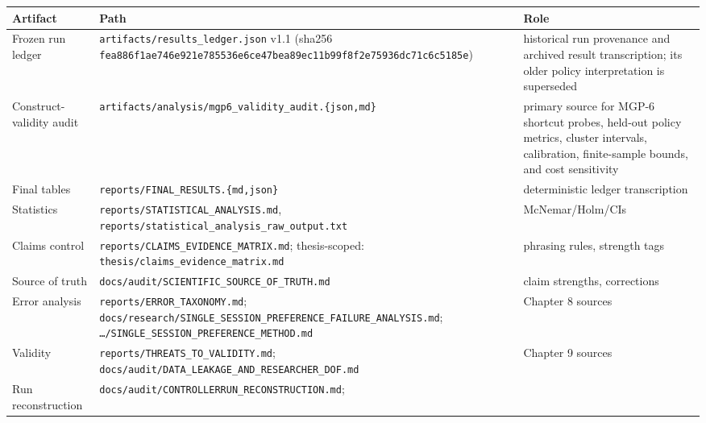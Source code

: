 {\def\LTcaptype{none} %
\begin{longtable}[]{@{}
  >{\raggedright\arraybackslash}p{}
  >{\raggedright\arraybackslash}p{}
  >{\raggedright\arraybackslash}p{}@{}}
\toprule\noalign{}
\begin{minipage}[b]{\linewidth}\raggedright
Artifact
\end{minipage} & \begin{minipage}[b]{\linewidth}\raggedright
Path
\end{minipage} & \begin{minipage}[b]{\linewidth}\raggedright
Role
\end{minipage} \\
\midrule\noalign{}
\endhead
\bottomrule\noalign{}
\endlastfoot
Frozen run ledger & \texttt{artifacts/results\_ledger.json} v1.1 (sha256
\texttt{fea886f1ae746e921e785536e6ce47bea89ec11b99f8f2e75936dc71c6c5185e})
& historical run provenance and archived result transcription; its older
policy interpretation is superseded \\
Construct-validity audit &
\texttt{artifacts/analysis/mgp6\_validity\_audit.\{json,md\}} & primary
source for MGP-6 shortcut probes, held-out policy metrics, cluster
intervals, calibration, finite-sample bounds, and cost sensitivity \\
Final tables & \texttt{reports/FINAL\_RESULTS.\{md,json\}} &
deterministic ledger transcription \\
Statistics & \texttt{reports/STATISTICAL\_ANALYSIS.md},
\texttt{reports/statistical\_analysis\_raw\_output.txt} &
McNemar/Holm/CIs \\
Claims control & \texttt{reports/CLAIMS\_EVIDENCE\_MATRIX.md};
thesis-scoped: \texttt{thesis/claims\_evidence\_matrix.md} & phrasing
rules, strength tags \\
Source of truth & \texttt{docs/audit/SCIENTIFIC\_SOURCE\_OF\_TRUTH.md} &
claim strengths, corrections \\
Error analysis & \texttt{reports/ERROR\_TAXONOMY.md};
\texttt{docs/research/SINGLE\_SESSION\_PREFERENCE\_FAILURE\_ANALYSIS.md};
\texttt{…/SINGLE\_SESSION\_PREFERENCE\_METHOD.md} & Chapter 8 sources \\
Validity & \texttt{reports/THREATS\_TO\_VALIDITY.md};
\texttt{docs/audit/DATA\_LEAKAGE\_AND\_RESEARCHER\_DOF.md} & Chapter 9
sources \\
Run reconstruction &
\texttt{docs/audit/CONTROLLERRUN\_RECONSTRUCTION.md};

\end{longtable}}

